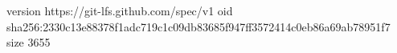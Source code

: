 version https://git-lfs.github.com/spec/v1
oid sha256:2330c13e88378f1adc719c1c09db83685f947ff3572414c0eb86a69ab78951f7
size 3655
